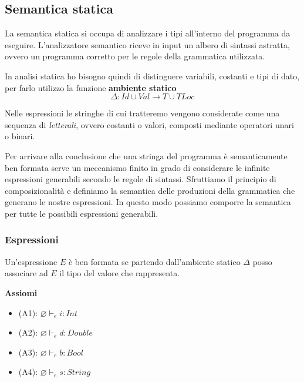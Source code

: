 \documentclass{article}
\begin{document}
\pagebreak
\subsection{Semantica statica}
La semantica statica si occupa di analizzare i tipi all'interno del programma da eseguire. L'analiz\-zatore semantico riceve in input un albero di sintassi astratta, ovvero un programma corretto per le regole della grammatica utilizzata.

In analisi statica ho bisogno quindi di distinguere variabili, costanti e tipi di dato, per farlo utilizzo la funzione \textbf{ambiente statico}
\[\Delta: Id \cup Val \rightarrow T \cup TLoc\]

Nelle espressioni le stringhe di cui tratteremo vengono considerate come una sequenza di \emph{letterali}, ovvero costanti o valori, composti mediante operatori unari o binari.

Per arrivare alla conclusione che una stringa del programma è semanticamente ben formata serve un meccanismo finito in grado di considerare le infinite espressioni generabili secondo le regole di sintassi. Sfruttiamo il principio di composizionalità e definiamo la semantica delle produzioni della grammatica che generano le nostre espressioni. In questo modo possiamo comporre la semantica per tutte le possibili espressioni generabili.

\subsubsection{Espressioni}
Un'espressione \(E\) è ben formata se partendo dall'ambiente statico \(\Delta\) posso associare ad \(E\) il tipo del valore che rappresenta.

\vspace{.2cm}

\noindent\textbf{Assiomi}
\begin{itemize}
    \item (A1): \(\varnothing \vdash_e i : Int\)
    \item (A2): \(\varnothing \vdash_e d : Double\)
    \item (A3): \(\varnothing \vdash_e b : Bool\)
    \item (A4): \(\varnothing \vdash_e s : String\)
\end{itemize}
\end{document}
